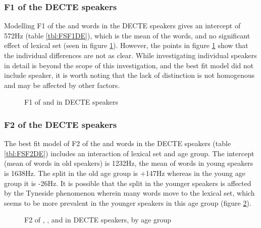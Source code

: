 \documentclass[../../../00.FullDoc/tex/ThesisSkeleton-draft2]{subfiles}
\begin{document}
\subsubsection{F1 of the DECTE speakers}
Modelling F1 of the \foot{} and \strutt{} words in the DECTE speakers gives an intercept of 572Hz (table \ref{tbl:FSF1DE}), which is the mean of the \foot{} words, and no significant effect of lexical set (seen in figure \ref{fig:FSF1DE}). However, the points in figure \ref{fig:FSF1DE} show that the individual differences are not as clear. While investigating individual speakers in detail is beyond the scope of this investigation, and the best fit model did not include speaker, it is worth noting that the lack of distinction is not homogenous and may be affected by other factors. 



\begin{figure}
	\centering
	
	\caption{F1 of \foot{} and \strutt{} in DECTE speakers} \label{fig:FSF1DE}
\end{figure}


\subsubsection{F2  of the DECTE speakers}
The best fit model of F2 of the \foot{} and \strutt{} words in the DECTE speakers (table \ref{tbl:FSF2DE}) includes an interaction of lexical set and age group. The intercept (mean of \foot{} words in old speakers) is 1232Hz, the mean of \foot{} words in young speakers is 1638Hz. The split in the old age group is +147Hz whereas in the young age group it is -26Hz. It is possible that the split in the younger speakers is affected by the Tyneside phenomenon wherein many \foot{} words move to the  lexical set, which seems to be more prevalent in the younger speakers in this age group (figure \ref{fig:FSGF2DE-age}). 




\begin{figure}
	\centering
	
	\caption{F2 of \foot{}, \strutt{}, and \goose{} in DECTE speakers, by age group} \label{fig:FSGF2DE-age}
\end{figure}
\end{document}
